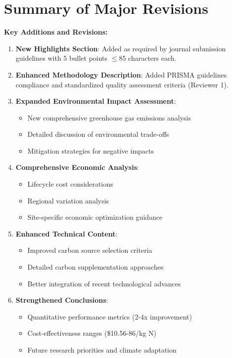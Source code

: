 \documentclass[12pt,a4paper]{article}
\begin{document}
\clearpage

\section*{Summary of Major Revisions}

\textbf{\textcolor{addedtext}{Key Additions and Revisions:}}

\begin{enumerate}
\item \textbf{New Highlights Section}: Added as required by journal submission guidelines with 5 bullet points $\leq$85 characters each.

\item \textbf{Enhanced Methodology Description}: Added PRISMA guidelines compliance and standardized quality assessment criteria (Reviewer 1).

\item \textbf{Expanded Environmental Impact Assessment}:
   \begin{itemize}
   \item New comprehensive greenhouse gas emissions analysis
   \item Detailed discussion of environmental trade-offs
   \item Mitigation strategies for negative impacts
   \end{itemize}

\item \textbf{Comprehensive Economic Analysis}:
   \begin{itemize}
   \item Lifecycle cost considerations
   \item Regional variation analysis
   \item Site-specific economic optimization guidance
   \end{itemize}

\item \textbf{Enhanced Technical Content}:
   \begin{itemize}
   \item Improved carbon source selection criteria
   \item Detailed carbon supplementation approaches
   \item Better integration of recent technological advances
   \end{itemize}

\item \textbf{Strengthened Conclusions}:
   \begin{itemize}
   \item Quantitative performance metrics (2-4x improvement)
   \item Cost-effectiveness ranges (\$10.56-86/kg N)
   \item Future research priorities and climate adaptation
   \end{itemize}
\end{enumerate}
\end{document}
